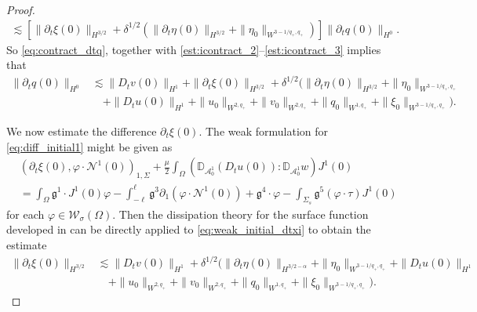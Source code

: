 \documentclass[letterpaper,reqno,10pt,twoside]{amsart}
\theoremstyle{definition}
\theoremstyle{remark}
\def\p{\partial}
\def\Om{\Omega}
\begin{document}
\begin{appendix}
\begin{proof}
\begin{equation}
\begin{aligned}
						\lesssim [\|\p_t\xi(0)\|_{H^{3/2}}+\delta^{1/2}(\|\p_t\eta(0)\|_{H^{3/2}}+\|\eta_0\|_{W^{3-1/q_+,q_+}})]\|\p_tq(0)\|_{H^0}.
					\end{aligned}
				\end{equation}
				So \eqref{eq:contract_dtq}, together with \eqref{est:icontract_2}--\eqref{est:icontract_3} implies that
				\begin{equation}\label{est:diff_dtq}
					\begin{aligned}
						\|\p_tq(0)\|_{H^0}&\lesssim\|D_tv(0)\|_{H^1}+\|\p_t\xi(0)\|_{H^{3/2}}+\delta^{1/2}(\|\p_t\eta(0)\|_{H^{3/2}}+\|\eta_0\|_{W^{3-1/q_+,q_+}}\\
						&\quad+\|D_tu(0)\|_{H^1}+\|u_0\|_{W^{2,q_+}}+\|v_0\|_{W^{2,q_+}}+\|q_0\|_{W^{1,q_+}}+\|\xi_0\|_{W^{3-1/q_+,q_+}}).
					\end{aligned}
				\end{equation}
				
				We now estimate the difference $\p_t\xi(0)$. The weak formulation for \eqref{eq:diff_initial1} might be given as
				\begin{equation}\label{eq:weak_initial_dtxi}
					\begin{aligned}
						&(\p_t\xi(0), \varphi\cdot\mathcal{N}^1(0))_{1,\Sigma}+\frac\mu2\int_\Om(\mathbb{D}_{\mathcal{A}_0^1}(D_tu(0)):\mathbb{D}_{\mathcal{A}_0^1}w)J^1(0)\\
						&=\int_\Om \mathfrak{g}^1\cdot J^1(0)\varphi-\int_{-\ell}^\ell \mathfrak{g}^3\p_1(\varphi\cdot\mathcal{N}^1(0))+\mathfrak{g}^4\cdot \varphi-\int_{\Sigma_s}\mathfrak{g}^5(\varphi\cdot\tau)J^1(0)
					\end{aligned}
				\end{equation}
				for each $\varphi\in \mathcal{W}_\sigma(\Om)$. Then the dissipation theory for the surface function developed in \cite{GT18} can  be directly applied to \eqref{eq:weak_initial_dtxi} to obtain the estimate
				\begin{equation}\label{est:diff_dtxi}
					\begin{aligned}
						\|\p_t\xi(0)\|_{H^{3/2}}&\lesssim \|D_tv(0)\|_{H^1}+\delta^{1/2}(\|\p_t\eta(0)\|_{H^{3/2-\alpha}}+\|\eta_0\|_{W^{3-1/q_+,q_+}}+\|D_tu(0)\|_{H^1}\\
						&\quad+\|u_0\|_{W^{2,q_+}}+\|v_0\|_{W^{2,q_+}}+\|q_0\|_{W^{1,q_+}}+\|\xi_0\|_{W^{3-1/q_+,q_+}}).
					\end{aligned}
				\end{equation}
				

\end{proof}
\end{appendix}
\end{document}
